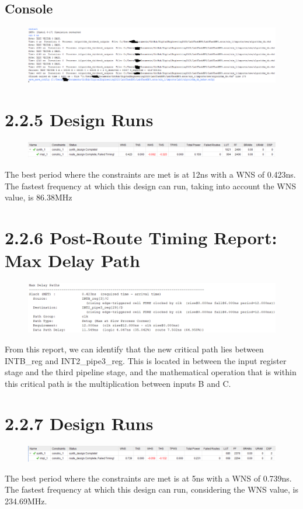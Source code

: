 \documentclass[11pt]{report}
\begin{document}
\subsection*{Console}
\begin{figure}[H]
    \includegraphics[width=\columnwidth]{Assets/2.2.4_console.png}
\end{figure}

\section*{2.2.5 Design Runs}
\begin{figure}[H]
    \includegraphics[width=\columnwidth]{Assets/2.2.5_design-runs.png}
\end{figure}
The best period where the constraints are met is at 12ns with a WNS of 0.423ns. The fastest frequency at which this design can run, taking into account the WNS value,
is 86.38MHz

\section*{2.2.6 Post-Route Timing Report: Max Delay Path}
\begin{figure}[H]
    \includegraphics[width=\columnwidth]{Assets/2.2.6_max-delay-path.png}
\end{figure}
From this report, we can identify that the new critical path lies between INTB\_reg and INT2\_pipe3\_reg. This is located in between the input register stage and the third pipeline stage, and the mathematical operation that is within this critical path is the multiplication between inputs B and C.

\section*{2.2.7 Design Runs}
\begin{figure}[H]
    \includegraphics[width=\columnwidth]{Assets/2.2.7_design-runs.png}
\end{figure}
The best period where the constraints are met is at 5ns with a WNS of 0.739ns. The fastest frequency at which this design can run, considering the WNS value, is 234.69MHz.
\end{document}
